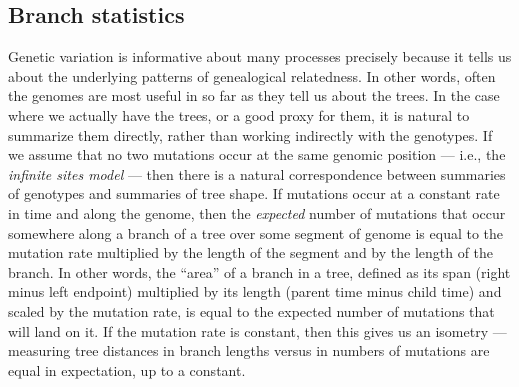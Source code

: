 \documentclass{article}
\begin{document}
\subsection*{Branch statistics}

Genetic variation is informative about many processes
precisely because it tells us about the underlying patterns of genealogical relatedness.
In other words, often the genomes are most useful in so far as they tell us about the trees.
In the case where we actually have the trees, or a good proxy for them,
it is natural to summarize them directly, rather than working indirectly with the genotypes.
If we assume that no two mutations occur at the same genomic position ---
i.e., the \emph{infinite sites model} ---
then there is a natural correspondence between summaries of genotypes and summaries of tree shape.
If mutations occur at a constant rate in time and along the genome,
then the \emph{expected} number of mutations that occur somewhere along a branch of a tree
over some segment of genome
is equal to the mutation rate multiplied by the length of the segment and by the length of the branch.
In other words, the ``area'' of a branch in a tree,
defined as its span (right minus left endpoint) multiplied by its length (parent time minus child time)
and scaled by the mutation rate,
is equal to the expected number of mutations that will land on it.
If the mutation rate is constant,
then this gives us an isometry ---
measuring tree distances in branch lengths versus in numbers of mutations
are equal in expectation, up to a constant.
\end{document}
